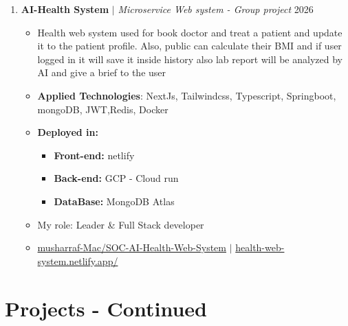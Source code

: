 \documentclass[10pt,a4paper]{article}
\newcommand{\project}[3]{%
  \textbf{#1} $|$ \textit{#2} \hfill #3}
\begin{document}
\begin{enumerate}
  \item \project{AI-Health System}{Microservice Web system - Group project}{2026}
   \begin{itemize}
    \item Health web system used for book doctor and treat a patient and update it to the patient profile. Also, public can calculate their BMI and if user logged in it will save it inside history also lab report will be analyzed by AI and give a brief to the user
    \item \textbf{Applied Technologies}: NextJs, Tailwindcss, Typescript, Springboot, mongoDB, JWT,Redis, Docker
    \item \textbf{Deployed in:}
      \begin{itemize}
        \item \textbf{Front-end:} netlify
        \item \textbf{Back-end:} GCP - Cloud run
        \item \textbf{DataBase:} MongoDB Atlas
      \end{itemize}
    \item My role: Leader \& Full Stack developer
    \item \faGithub \href{https://github.com/musharraf-Mac/SOC-AI-Health-Web-System}{ musharraf-Mac/SOC-AI-Health-Web-System} \hspace{0.15cm} $|$ \hspace{0.15cm} \faLink \href{https://health-web-system.netlify.app/}{ health-web-system.netlify.app/}
   \end{itemize}

\end{enumerate}
\vspace{8pt}
\section{Projects - Continued}
\end{document}
